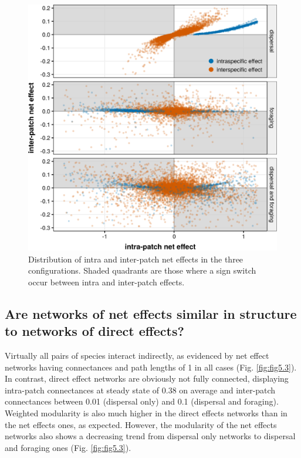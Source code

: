 \begin{figure}[!ht]
\centering
\includegraphics[width=.7\textwidth,height=\textheight,keepaspectratio]{./Figures/chapter05/Fig_2.png}
\caption[Intra and interpatch net effects]{\color{Gray}Distribution of intra and inter-patch net effects in the three configurations. Shaded quadrants are those where a sign switch occur between intra and inter-patch effects.}\label{fig:fig5.2}
\end{figure}

\FloatBarrier

\subsection*{Are networks of net effects similar in structure to networks of direct effects?}

Virtually all pairs of species interact indirectly, as evidenced by net effect networks having connectances and path lengths of 1 in all cases (Fig. \ref{fig:fig5.3}). In contrast, direct effect networks are obviously not fully connected, displaying intra-patch connectances at steady state of 0.38 on average and inter-patch connectances between 0.01 (dispersal only) and 0.1 (dispersal and foraging). Weighted modularity is also much higher in the direct effects networks than in the net effects ones, as expected. However, the modularity of the net effects networks also shows a decreasing trend from dispersal only networks to dispersal and foraging ones (Fig. \ref{fig:fig5.3}).

